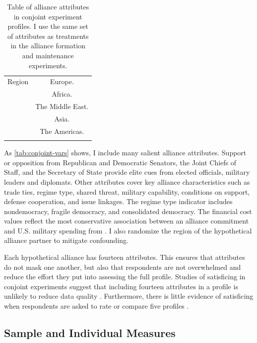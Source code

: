 \documentclass[12pt]{article}
\begin{document}
\begin{table}
\begin{adjustbox}{width = .99\textwidth}
\begin{tabular}{lc}
Region              & Europe. \\ 
                    & Africa. \\
                    & The Middle East. \\ 
                    & Asia. \\   
                    & The Americas. \\ 
                                                                            
\hline \\
\end{tabular}
\end{adjustbox}
\caption{Table of alliance attributes in conjoint experiment profiles. I use the same set of attributes as treatments in the alliance formation and maintenance experiments.} 
\label{tab:conjoint-vars}
\end{table}


As \autoref{tab:conjoint-vars} shows, I include many salient alliance attributes.
Support or opposition from Republican and Democratic Senators, the Joint Chiefs of Staff, and the Secretary of State provide elite cues from elected officials, military leaders and diplomats. 
Other attributes cover key alliance characteristics such as trade ties, regime type, shared threat, military capability, conditions on support, defense cooperation, and issue linkages.
The regime type indicator includes nondemocracy, fragile democracy, and consolidated democracy. 
The financial cost values reflect the most conservative association between an alliance commitment and U.S. military spending from \citet{AlleyFuhrmann2021}. 
I also randomize the region of the hypothetical alliance partner to mitigate confounding.  


Each hypothetical alliance has fourteen attributes.
This ensures that attributes do not mask one another, but also that respondents are not overwhelmed and reduce the effort they put into assessing the full profile.
Studies of satisficing in conjoint experiments suggest that including fourteen attributes in a profile is unlikely to reduce data quality \citep{Bansaketal2019}. 
Furthermore, there is little evidence of satisficing when respondents are asked to rate or compare five profiles \citep{Bansaketal2018}.



\subsection{Sample and Individual Measures}
\end{document}
